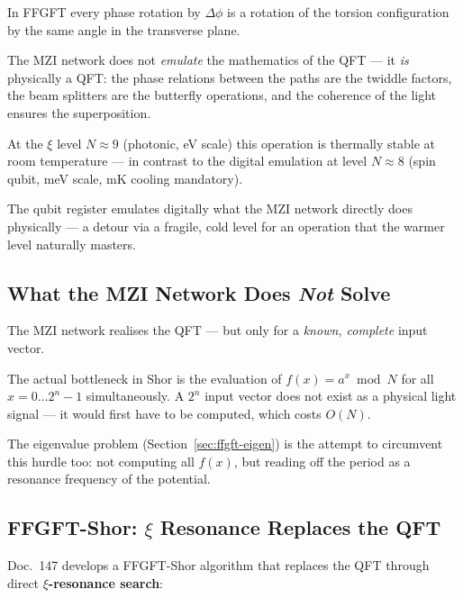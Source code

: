 \begin{foundation}
In FFGFT every phase rotation by $\Delta\phi$
is a rotation of the torsion configuration
by the same angle in the transverse plane.

The MZI network does not \emph{emulate} the mathematics
of the QFT --- it \emph{is} physically a QFT:
the phase relations between the paths are
the twiddle factors, the beam splitters are
the butterfly operations, and the coherence
of the light ensures the superposition.

At the $\xi$ level $N \approx 9$ (photonic, eV scale)
this operation is thermally stable at room temperature ---
in contrast to the digital emulation at level $N \approx 8$
(spin qubit, meV scale, mK cooling mandatory).

The qubit register emulates digitally what the MZI network
directly does physically --- a detour via a
fragile, cold level for an operation that the
warmer level naturally masters.
\end{foundation}

\subsection{\texorpdfstring{What the MZI Network Does \emph{Not} Solve}{What the MZI Network Does Not Solve}}

The MZI network realises the QFT --- but only for
a \emph{known, complete} input vector.

The actual bottleneck in Shor is the
evaluation of $f(x) = a^x \bmod N$ for all
$x = 0 \ldots 2^n-1$ simultaneously.
A $2^n$ input vector does not exist as a
physical light signal --- it would first have to be
computed, which costs $O(N)$.

The eigenvalue problem (Section~\ref{sec:ffgft-eigen})
is the attempt to circumvent this hurdle too:
not computing all $f(x)$, but reading off the period
as a resonance frequency of the potential.

\subsection{\texorpdfstring{FFGFT-Shor: $\xi$ Resonance Replaces the QFT}{FFGFT-Shor:  Resonance Replaces the QFT}}

Doc.~147 develops a FFGFT-Shor algorithm
that replaces the QFT through direct \textbf{$\xi$-resonance search}:

